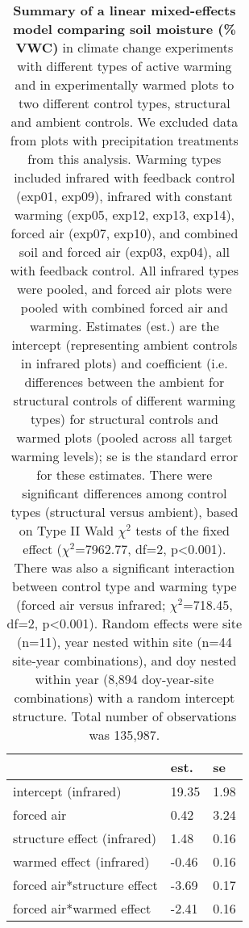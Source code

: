 \documentclass{article}
\begin{document}
\begin{table}[ht]
\centering
\caption{\textbf{Summary of a linear mixed-effects model comparing soil moisture (\% VWC)} in climate change experiments with different types of active warming and in experimentally warmed plots to two different control types, structural and ambient controls. We excluded data from plots with precipitation treatments from this analysis. Warming types included infrared with feedback control (exp01, exp09), infrared with constant warming (exp05, exp12, exp13, exp14), forced air (exp07, exp10), and combined soil and forced air (exp03, exp04), all with feedback control.  All infrared types were pooled, and forced air plots were pooled with combined forced air and warming.  Estimates (est.) are the intercept (representing ambient controls in infrared plots) and coefficient (i.e. differences between the ambient for structural controls of different warming types) for structural controls and warmed plots (pooled across all target warming levels); se is the standard error for these estimates. There were significant differences among control types (structural versus ambient), based on Type II Wald $\chi^{2}$ tests of the fixed effect ($\chi^{2}$=7962.77, df=2, p<0.001). There was also a significant interaction between control type and warming type (forced air versus infrared; $\chi^{2}$=718.45, df=2, p<0.001). Random effects were site (n=11), year nested within site (n=44 site-year combinations), and doy nested within year (8,894 doy-year-site combinations) with a random intercept structure. Total number of observations was 135,987.} 
\label{table:warmsoilmois}
\begingroup\footnotesize
\begin{tabular}{|p{}|p{}p{}|}
  \hline
 & est. & se \\ 
  \hline
intercept (infrared) & 19.35 & 1.98 \\ 
  forced air & 0.42 & 3.24 \\ 
  structure effect (infrared) & 1.48 & 0.16 \\ 
  warmed effect (infrared) & -0.46 & 0.16 \\ 
  forced air*structure effect & -3.69 & 0.17 \\ 
  forced air*warmed effect & -2.41 & 0.16 \\ 
   \hline
\end{tabular}
\endgroup
\end{table}%
\end{document}
